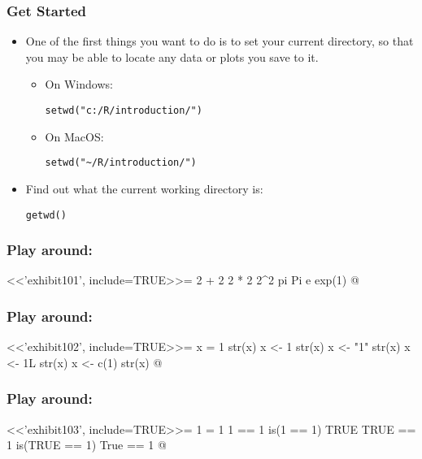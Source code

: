 \begin{frame}[fragile]
\frametitle{Get Started}
\begin{itemize}
\item One of the first things you want to do is to set your current directory, so that you may be able to locate any data or plots you save to it.
\begin{itemize}
\item On Windows:
\begin{lstlisting}
setwd("c:/R/introduction/")
\end{lstlisting}
\item On MacOS:
\begin{lstlisting}
setwd("~/R/introduction/")
\end{lstlisting}
\end{itemize}
\item Find out what the current working directory is:
\begin{lstlisting}
getwd()
\end{lstlisting}
\end{itemize}
\end{frame}




\begin{frame}[fragile]%
\frametitle{Play around:}
<<'exhibit101', include=TRUE>>=
  2 + 2
  2 * 2
  2^2
  pi
  Pi
  e
  exp(1)
@
\end{frame}


\begin{frame}[fragile]%
\frametitle{Play around:}
<<'exhibit102', include=TRUE>>=
  x = 1
  str(x)
  x <- 1
  str(x)
  x <- "1"
  str(x)
  x <- 1L
  str(x)
  x <- c(1)
  str(x)
@
\end{frame}


\begin{frame}[fragile]%
\frametitle{Play around:}
<<'exhibit103', include=TRUE>>=
  1 = 1
  1 == 1
  is(1 == 1)
  TRUE
  TRUE == 1
  is(TRUE == 1)
  True == 1
@
\end{frame}


